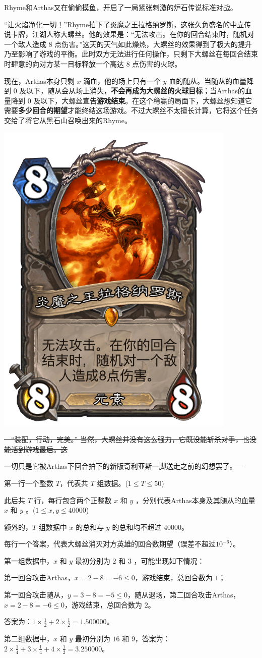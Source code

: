 
Rhyme和Arthas又在偷偷摸鱼，开启了一局紧张刺激的炉石传说标准对战。

“让火焰净化一切！”Rhyme拍下了炎魔之王拉格纳罗斯，这张久负盛名的中立传说卡牌，江湖人称大螺丝。他的效果是：“无法攻击。在你的回合结束时，随机对一个敌人造成 $8$ 点伤害。”这天的天气如此燥热，大螺丝的效果得到了极大的提升乃至影响了游戏的平衡。此时双方无法进行任何操作，只剩下大螺丝在每回合结束时肆意的向对方某一目标释放一个高达 $8$ 点伤害的火球。

现在，Arthas本身只剩 $x$ 滴血，他的场上只有一个 $y$ 血的随从。当随从的血量降到 $0$ 及以下，随从会从场上消失，\textbf{不会再成为大螺丝的火球目标}；当Arthas的血量降到 $0$ 及以下，大螺丝宣告\textbf{游戏结束}。在这个稳赢的局面下，大螺丝想知道它需要\textbf{多少回合的期望}才能终结这场游戏。不过大螺丝不太擅长计算，它将这个任务交给了将它从黑石山召唤出来的Rhyme。

\includegraphics[width=.3\linewidth]{image3.png}


\sout{~~“装配，行动，完美。” 当然，大螺丝并没有这么强力，它既没能斩杀对手，也没能活到游戏最后。这}

\sout{一切只是它被Arthas下回合拍下的新版奇利亚斯一脚送走之前的幻想罢了。~~}


第一行一个整数 $T$，代表共 $T$ 组数据。($1 \leqslant T \leqslant 50$)

此后共 $T$ 行，每行包含两个正整数 $x$ 和 $y$ ，分别代表Arthas本身及其随从的血量 $x$ 和 $y$ 。($1 \leqslant x, y \leqslant 40000$)

额外的，$T$ 组数据中 $x$ 的总和与 $y$ 的总和均不超过 $40000$。



每行一个答案，代表大螺丝消灭对方英雄的回合数期望（误差不超过$10^{-6}$）。



第一组数据中，$x$ 和 $y$ 最初分别为 $2$ 和 $3$ ，可能出现如下情况：

第一回合攻击Arthas，$x = 2 - 8 = -6 \leqslant 0$，游戏结束，总回合数为 $1$；

第一回合攻击随从，$y = 3 - 8 = -5 \leqslant 0$，随从退场，第二回合攻击Arthas，$x = 2 - 8 = -6 \leqslant 0$，游戏结束，总回合数为 $2$。

答案为：$1 \times \frac{1}{2} + 2 \times \frac{1}{2} = 1.500000$。

第二组数据中，$x$ 和 $y$ 最初分别为 $16$ 和 $9$，答案为：$2 \times \frac{1}{4} + 3 \times \frac{1}{4} + 4 \times \frac{1}{2} = 3.250000$。
